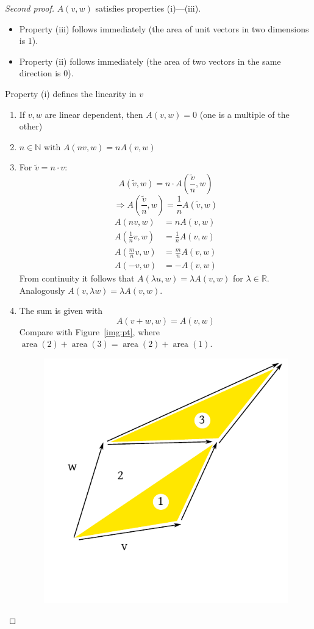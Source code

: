 \documentclass[a4paper,landscape,twocolumn]{article}
\begin{document}
\begin{proof}[Second proof]
  $A(v,w)$ satisfies properties (i)---(iii).
  \begin{itemize}
    \item Property (iii) follows immediately (the area of unit vectors in two dimensions is 1).
    \item Property (ii) follows immediately (the area of two vectors in the same direction is 0).
  \end{itemize}
  Property (i) defines the linearity in $v$
  \begin{enumerate}
    \item If $v,w$ are linear dependent, then $A(v,w) = 0$ (one is a multiple of the other)
    \item $n\in \mathbb N$ with $A(nv,w) = nA(v,w)$
    \item For $\tilde{v} = n \cdot v$:
      \[ A(\tilde{v}, w) = n \cdot A(\frac{\tilde{v}}{n}, w) \]
      \[ \Rightarrow A(\frac{\tilde{v}}{n}, w) = \frac1n A(\tilde{v}, w) \]
      \begin{align*}
        A(nv,w) &= n A(v,w) \\
        A(\frac1n v, w) &= \frac1n A(v,w) \\
        A(\frac mn v, w) &= \frac mn A(v,w) \\
        A(-v,w) &= -A(v,w)
      \end{align*}
      From continuity it follows that $A(\lambda u, w) = \lambda A(v, w)$ for $\lambda \in \mathbb R$.
      Analogously $A(v, \lambda w) = \lambda A(v, w)$.
    \item The sum is given with
      \[ A(v + w, w) = A(v, w) \]
      Compare with Figure~\ref{img:pt}, where $\operatorname{area}(2) + \operatorname{area}(3) = \operatorname{area}(2) + \operatorname{area}(1)$.
      \begin{figure}[!h]
        \begin{center}
          \includegraphics{img/parallelogram-translation.pdf}

\end{center}
\end{figure}
\end{enumerate}
\end{proof}
\end{document}

